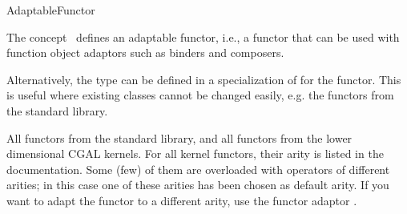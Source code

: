 \begin{ccRefFunctionObjectConcept}{AdaptableFunctor}
  
  \ccDefinition The concept \ccRefName\ defines an adaptable functor,
  i.e., a functor that can be used with function object adaptors such
  as binders and composers.

  \ccTypes 
  
     
  
  \ccOperations
  
  \ccTagFullDeclarations{}
    \ccTagDefaults
    
   Alternatively, the type  can be defined
  in a specialization of  for the functor.
  This is useful where existing classes cannot be changed easily, e.g.
  the functors from the standard library.
  
  \ccHasModels All functors from the standard library, and all
  functors from the lower dimensional CGAL kernels. For all kernel
  functors, their arity is listed in the documentation. Some (few) of
  them are overloaded with operators of different arities; in this
  case one of these arities has been chosen as default arity. If you
  want to adapt the functor to a different arity, use the functor
  adaptor .
  
  \ccSeeAlso
  \\
  \\
  \\
  \\
  \\
  \\
  \\
  \\

\end{ccRefFunctionObjectConcept}

